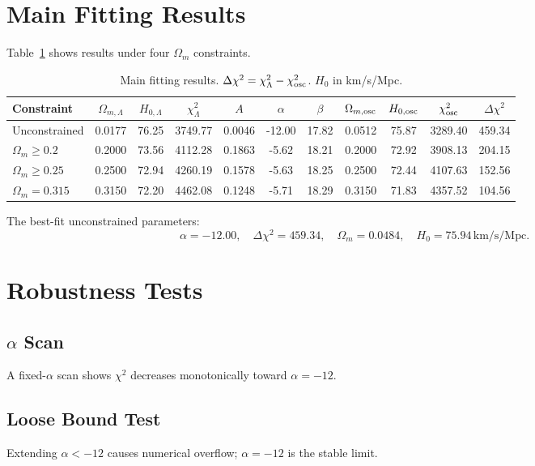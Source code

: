 \documentclass[10pt,twocolumn]{article}
\begin{document}
\section{Main Fitting Results}
Table~\ref{tab:main} shows results under four \(\Omega_m\) constraints.

\begin{table}[htbp]
\centering
\caption{Main fitting results. \(\Delta\chi^2=\chi^2_\Lambda-\chi^2_{\rm osc}\). \(H_0\) in km/s/Mpc.}
\label{tab:main}
\begin{tabular}{lcccccccccc}
\toprule
Constraint & \(\Omega_{m,\Lambda}\) & \(H_{0,\Lambda}\) & \(\chi^2_\Lambda\) 
& \(A\) & \(\alpha\) & \(\beta\) & \(\Omega_{m,\rm osc}\) & \(H_{0,\rm osc}\) & \(\chi^2_{\rm osc}\) & \(\Delta\chi^2\) \\
\midrule
Unconstrained & 0.0177 & 76.25 & 3749.77 
& 0.0046 & -12.00 & 17.82 & 0.0512 & 75.87 & 3289.40 & 459.34 \\
\(\Omega_m\ge0.2\) & 0.2000 & 73.56 & 4112.28 
& 0.1863 & -5.62 & 18.21 & 0.2000 & 72.92 & 3908.13 & 204.15 \\
\(\Omega_m\ge0.25\) & 0.2500 & 72.94 & 4260.19 
& 0.1578 & -5.63 & 18.25 & 0.2500 & 72.44 & 4107.63 & 152.56 \\
\(\Omega_m=0.315\) & 0.3150 & 72.20 & 4462.08 
& 0.1248 & -5.71 & 18.29 & 0.3150 & 71.83 & 4357.52 & 104.56 \\
\bottomrule
\end{tabular}
\end{table}

The best-fit unconstrained parameters:
\[
\alpha=-12.00,\quad \Delta\chi^2=459.34,\quad \Omega_m=0.0484,\quad H_0=75.94\,\text{km/s/Mpc}.
\]

\section{Robustness Tests}

\subsection{\(\alpha\) Scan}
A fixed-\(\alpha\) scan shows \(\chi^2\) decreases monotonically toward \(\alpha=-12\).

\subsection{Loose Bound Test}
Extending \(\alpha<-12\) causes numerical overflow; \(\alpha=-12\) is the stable limit.
\end{document}
